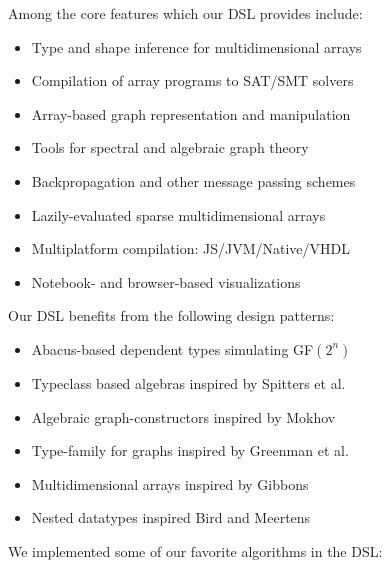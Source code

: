 \documentclass[sigplan,10pt,review,anonymous]{acmart}
\begin{document}
Among the core features which our DSL provides include:

\begin{itemize}
  \item Type and shape inference for multidimensional arrays
  \item Compilation of array programs to SAT/SMT solvers
  \item Array-based graph representation and manipulation
  \item Tools for spectral and algebraic graph theory
  \item Backpropagation and other message passing schemes
  \item Lazily-evaluated sparse multidimensional arrays
  \item Multiplatform compilation: JS/JVM/Native/VHDL
  \item Notebook- and browser-based visualizations
\end{itemize}

\noindent Our DSL benefits from the following design patterns:

\begin{itemize}
  \item Abacus-based dependent types simulating GF$(2^n)$
  \item Typeclass based algebras inspired by Spitters et al.~\citep{spitters2011type}
  \item Algebraic graph-constructors inspired by Mokhov~\citep{mokhov2017algebraic}
  \item Type-family for graphs inspired by Greenman et al.~\citep{greenman2014getting}
  \item Multidimensional arrays inspired by Gibbons~\citep{gibbons2017aplicative}
  \item Nested datatypes inspired Bird and Meertens~\cite{bird1998nested}
\end{itemize}

\noindent We implemented some of our favorite algorithms in the DSL:
\end{document}

